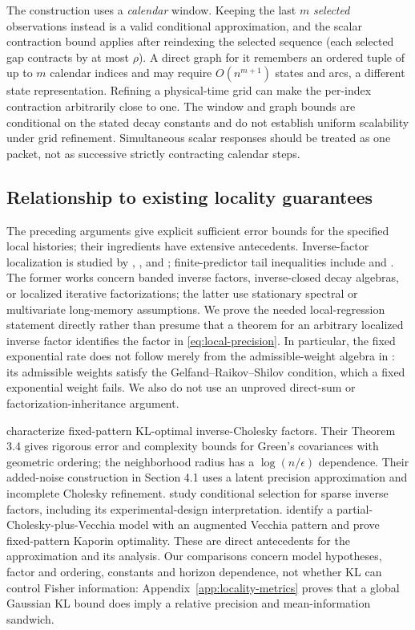 The construction uses a \emph{calendar} window. Keeping the last $m$
\emph{selected} observations instead is a valid conditional approximation,
and the scalar contraction bound applies after reindexing the selected
sequence (each selected gap contracts by at most $\rho$). A direct graph
for it remembers an ordered tuple of up to $m$ calendar indices and may
require $O(n^{m+1})$ states and arcs, a different state representation.
Refining a physical-time grid can make the per-index contraction
arbitrarily close to one. The window and graph bounds are conditional on
the stated decay constants and do not establish uniform scalability under
grid refinement. Simultaneous scalar responses should be treated as one
packet, not as successive strictly contracting calendar steps.

\subsection{Relationship to existing locality guarantees}
\label{subsec:locality-prior}
The preceding arguments give explicit sufficient error bounds for the
specified local histories; their ingredients have extensive antecedents.
Inverse-factor localization is studied by \citet{BenziTuma2000},
\citet{Krishtal2015}, and \citet{Rubensson2021}; finite-predictor tail
inequalities include \citet{Meyer2015} and \citet{Inoue2018}.
The former works concern banded inverse factors, inverse-closed decay
algebras, or localized iterative factorizations; the latter use stationary
spectral or multivariate long-memory assumptions. We prove the needed
local-regression statement directly rather than presume that a theorem for
an arbitrary localized inverse factor identifies the factor in
\eqref{eq:local-precision}. In particular, the fixed exponential rate does
not follow merely from the admissible-weight algebra in
\citet[Corollary 5.1]{Krishtal2015}: its admissible weights satisfy the
Gelfand--Raikov--Shilov condition, which a fixed exponential weight fails.
We also do not use an unproved direct-sum or factorization-inheritance
argument.

\citet[Theorem 2.1]{Schafer2021} characterize fixed-pattern KL-optimal
inverse-Cholesky factors. Their Theorem 3.4 gives rigorous error and complexity
bounds for Green's covariances with geometric ordering; the neighborhood
radius has a $\log(n/\epsilon)$ dependence. Their added-noise construction
in Section 4.1 uses a latent precision approximation and incomplete Cholesky
refinement. \citet{Huan2025} study conditional selection for sparse inverse
factors, including its experimental-design interpretation.
\citet{KaminetzWebber2026} identify a partial-Cholesky-plus-Vecchia model
with an augmented Vecchia pattern and prove fixed-pattern Kaporin optimality.
These are direct antecedents for the approximation and its analysis.
Our comparisons concern model hypotheses, factor and ordering, constants
and horizon dependence, not whether KL can control Fisher information:
Appendix~\ref{app:locality-metrics} proves that a global Gaussian KL bound
does imply a relative precision and mean-information sandwich.


